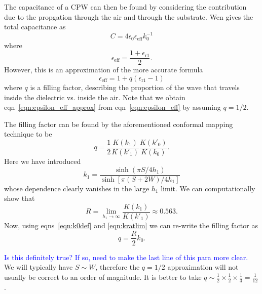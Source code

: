 \documentclass[a4paper]{article}
\newcommand{\cm}[1]{\textcolor{blue}{#1}} %
\begin{document}
The capacitance of a CPW can then be found by considering the contribution due
to the propgation through the air and through the substrate. Wen gives the
total capacitance as~\cite{Simons2004}
\begin{equation}
  C = 4\epsilon_0\epsilon_\mathrm{eff} k_0^{-1}
\end{equation}
where
\begin{equation}
  \epsilon_\mathrm{eff} = \frac{1 + \epsilon_\mathrm{r1}}{2}.
  \label{eqn:epsilon_eff_approx}
\end{equation}
However, this is an approximation of the more accurate
formula~\cite{Simons2004}
\begin{equation}
  \epsilon_\mathrm{eff} = 1 + q(\epsilon_\mathrm{r1} - 1)
  \label{eqn:epsilon_eff}
\end{equation}
where $q$ is a filling factor, describing the proportion of the wave that
travels inside the dielectric vs. inside the air. Note that we obtain
eqn~\ref{eqn:epsilon_eff_approx} from eqn~\ref{eqn:epsilon_eff} by assuming $q =
1/2$.

The filling factor can be found by the aforementioned conformal mapping
technique to be~\cite{Simons2004}
\begin{equation}
  q = \frac{1}{2}\frac{K(k_1)}{K(k'_1)}\frac{K(k'_0)}{K(k_0)}.
  \label{eqn:fillfact}
\end{equation}
Here we have introduced
\begin{equation*}
  k_1 = \frac{\sinh (\pi S/ 4h_1)}{\sinh [\pi (S+2W)/4h_1]}
\end{equation*}
whose dependence clearly vanishes in the large $h_1$ limit. We can
computationally show that
\begin{equation}
  R = \lim_{h_1 \to \infty} \frac{K(k_1)}{K(k'_1)} \approx 0.563.
  \label{eqn:kratlim}
\end{equation}
Now, using eqns~\ref{eqn:k0def} and \ref{eqn:kratlim} we can re-write the
filling factor as
\begin{equation}
  q = \frac{R}{2}k_0.
\end{equation}

\cm{Is this definitely true? If so, need to make the last line of this para more
clear.}
We will typically have $S\sim W$, therefore the $q=1/2$ approximation will  not
usually be correct to an order of magnitude. It is better to take $q\sim
\frac{1}{2} \times \frac{1}{2} \times \frac{1}{3} = \frac{1}{12}$.
\end{document}
